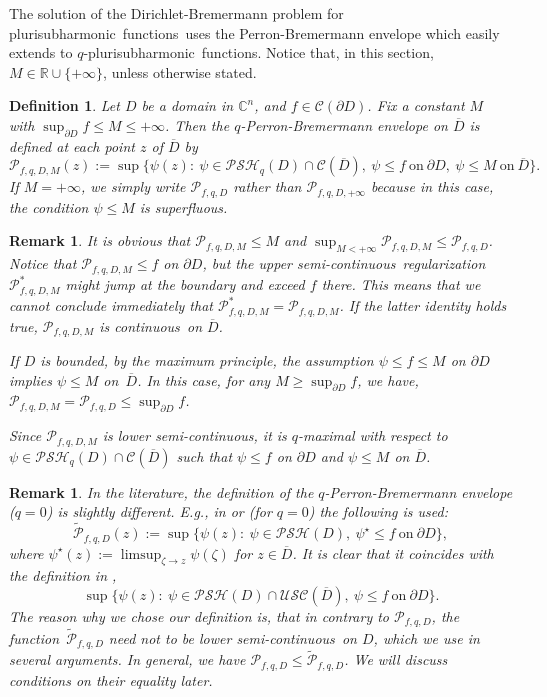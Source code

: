 \documentclass[10pt,a4paper]{amsart}
\newtheorem{defn}[thm]{Definition}
\newtheorem{rem}[thm]{Remark}
\numberwithin{equation}{section}
\newcommand{\cbb}{\mathbb{C}}
\newcommand{\rbb}{\mathbb{R}}
\newcommand{\ccal}{\mathcal{C}}
\newcommand{\pcal}{\mathcal{P}}
\newcommand{\USC}{\mathcal{USC}}
\newcommand{\psh}{pluri\-sub\-harmonic}
\newcommand{\qpsh}{$q$-pluri\-sub\-harmonic}
\newcommand{\PSH}{\mathcal{PSH}}
\newcommand{\cont}{continuous}
\newcommand{\usc}{upper semi-continuous}
\newcommand{\lsc}{lower semi-continuous}
\newcommand{\fct}{function}
\newcommand{\fcts}{functions}
\newcommand{\cld}{\overline{D}}
\begin{document}
The solution of the Dirichlet-Bremermann problem for \psh\ \fcts\ uses the Perron-Bremermann envelope which easily extends to \qpsh\ \fcts. Notice that, in this section, $M \in \rbb\cup\{+\infty\}$, unless otherwise stated.

\begin{defn}\label{defn-q-Perron}  Let $D$ be a domain in $\cbb^n$, and $f \in \ccal(\partial D)$.  Fix a constant $M$ with $\sup_{\partial D} f \leq M \leq +\infty$. Then the \textit{$q$-Perron-Bremermann envelope} on $\cld$ is defined at each point $z$ of $\cld$ by
\[
\pcal_{f,q,D,M}(z):=\sup\{\psi(z) : \ \psi \in \PSH_q(D)\cap \ccal(\cld), \ \psi \leq f \ \text{on}\ \partial D, \ \psi \leq M \ \text{on}\ \cld\}.
\]
If $M=+\infty$, we simply write $\pcal_{f,q,D}$ rather than $\pcal_{f,q,D,+\infty}$ because in this case, the condition $\psi \leq M$ is superfluous.
\end{defn}

\begin{rem} It is obvious that $\pcal_{f,q,D,M} \leq M$ and $\sup_{M<+\infty} \pcal_{f,q,D,M} \leq \pcal_{f,q,D}$. Notice that $\pcal_{f,q,D,M} \leq f$ on $\partial D$, but the \usc\ regularization $\pcal_{f,q,D,M}^*$ might jump at the boundary and exceed $f$ there. This means that we cannot conclude immediately that $\pcal_{f,q,D,M}^*=\pcal_{f,q,D,M}$. If the latter identity holds true, $\pcal_{f,q,D,M}$ is \cont\ on $\cld$.

If $D$ is bounded, by the maximum principle, the assumption $\psi \leq f \leq M$ on $\partial D$ implies $\psi \leq M$ on~$\cld$. In this case, for any $M \geq \sup_{\partial D} f$, we have, $\pcal_{f,q,D,M}  = \pcal_{f,q,D} \leq \sup_{\partial D} f$. 

Since $\pcal_{f,q,D,M}$ is \lsc, it is $q$-maximal with respect to $\psi \in \PSH_q(D) \cap \ccal(\cld)$ such that $\psi \leq f$ on $\partial D$ and $\psi \leq M$ on $\cld$.
\end{rem}

\begin{rem}\label{rem-slightly} In the literature, the definition of the $q$-Perron-Bremermann envelope ($q=0$) is slightly different. E.g., in \cite{NH} or \cite{NTT} (for $q=0$) the following is used:
\[
\widetilde{\pcal}_{f,q,D}(z):=\sup\{\psi(z) : \ \psi \in \PSH(D), \ \psi^{\star} \leq f \ \text{on}\ \partial D\},
\]
where $\psi^{\star}(z):=\limsup_{\zeta \to z}\psi(\zeta)$ for $z \in \cld$. It is clear that it coincides with the definition in \cite{HM},
\[
\sup\{\psi(z) : \ \psi \in \PSH(D)\cap\USC(\cld), \ \psi \leq f \ \text{on}\ \partial D\}.
\]
The reason why we chose our definition is, that in contrary to $\pcal_{f,q,D}$, the \fct\ $\widetilde{\pcal}_{f,q,D}$ need not to be \lsc\ on $D$, which we use in several arguments. In general, we have $\pcal_{f,q,D} \leq \widetilde{\pcal}_{f,q,D}$. We will discuss conditions on their equality later.
\end{rem}
\end{document}
